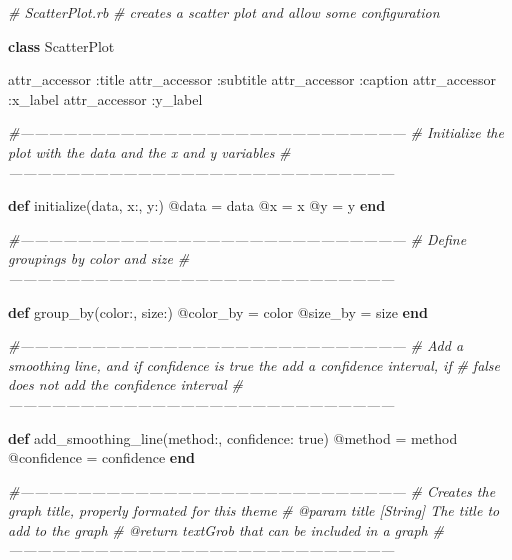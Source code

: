\documentclass[]{article}
\newenvironment{Shaded}{\begin{snugshade}}{\end{snugshade}}
\newcommand{\KeywordTok}[1]{\textcolor[rgb]{0.13,0.29,0.53}{\textbf{#1}}}
\newcommand{\DataTypeTok}[1]{\textcolor[rgb]{0.13,0.29,0.53}{#1}}
\newcommand{\DecValTok}[1]{\textcolor[rgb]{0.00,0.00,0.81}{#1}}
\newcommand{\StringTok}[1]{\textcolor[rgb]{0.31,0.60,0.02}{#1}}
\newcommand{\CommentTok}[1]{\textcolor[rgb]{0.56,0.35,0.01}{\textit{#1}}}
\newcommand{\OtherTok}[1]{\textcolor[rgb]{0.56,0.35,0.01}{#1}}
\newcommand{\NormalTok}[1]{#1}
\begin{document}
\begin{Shaded}
\begin{Highlighting}[]
\CommentTok{# ScatterPlot.rb}
\CommentTok{# creates a scatter plot and allow some configuration}
    
\KeywordTok{class} \DataTypeTok{ScatterPlot}

  \OtherTok{attr_accessor} \StringTok{:title}
  \OtherTok{attr_accessor} \StringTok{:subtitle}
  \OtherTok{attr_accessor} \StringTok{:caption}
  \OtherTok{attr_accessor} \StringTok{:x_label}
  \OtherTok{attr_accessor} \StringTok{:y_label}
  
  \CommentTok{#---------------------------------------------------------------------------------}
  \CommentTok{# Initialize the plot with the data and the x and y variables}
  \CommentTok{#---------------------------------------------------------------------------------}

  \KeywordTok{def}\NormalTok{ initialize(data, x:, y:)}
    \OtherTok{@data}\NormalTok{ = data}
    \OtherTok{@x}\NormalTok{ = x}
    \OtherTok{@y}\NormalTok{ = y}
  \KeywordTok{end}
  
  \CommentTok{#---------------------------------------------------------------------------------}
  \CommentTok{# Define groupings by color and size}
  \CommentTok{#---------------------------------------------------------------------------------}

  \KeywordTok{def}\NormalTok{ group_by(color:, size:)}
    \OtherTok{@color_by}\NormalTok{ = color}
    \OtherTok{@size_by}\NormalTok{ = size}
  \KeywordTok{end}

  \CommentTok{#---------------------------------------------------------------------------------}
  \CommentTok{# Add a smoothing line, and if confidence is true the add a confidence interval, if}
  \CommentTok{# false does not add the confidence interval}
  \CommentTok{#---------------------------------------------------------------------------------}

  \KeywordTok{def}\NormalTok{ add_smoothing_line(method:, }\StringTok{confidence: }\DecValTok{true}\NormalTok{)}
    \OtherTok{@method}\NormalTok{ = method}
    \OtherTok{@confidence}\NormalTok{ = confidence}
  \KeywordTok{end}
  
  \CommentTok{#---------------------------------------------------------------------------------}
  \CommentTok{# Creates the graph title, properly formated for this theme}
  \CommentTok{# @param title [String] The title to add to the graph}
  \CommentTok{# @return textGrob that can be included in a graph}
  \CommentTok{#---------------------------------------------------------------------------------}


\end{Highlighting}
\end{Shaded}
\end{document}
